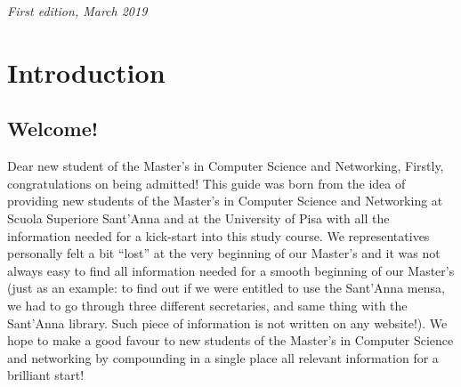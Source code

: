 \documentclass[11pt,fleqn,oneside]{book} %
\begin{document}
\noindent \textit{First edition, March 2019} %




\pagestyle{empty} %


\tableofcontents %

\cleardoublepage %

\pagestyle{fancy} %



\chapter{Introduction}


\section{Welcome!}

Dear new student of the Master’s in Computer Science and Networking,
Firstly, congratulations on being admitted!  This guide was born from the idea of providing new students of the Master’s in Computer Science and Networking at Scuola Superiore Sant’Anna and at the University of Pisa with all the information needed for a kick-start into this study course. We representatives personally felt a bit “lost” at the very beginning of our Master’s and it was not always easy to find all information needed for a smooth beginning of our Master’s (just as an example: to find out if we were entitled to use the Sant’Anna mensa, we had to go through three different secretaries, and same thing with the Sant’Anna library. Such piece of information is not written on any website!). 
We hope to make a good favour to new students of the Master’s in Computer Science and networking by compounding in a single place all relevant information for a brilliant start!
\end{document}

